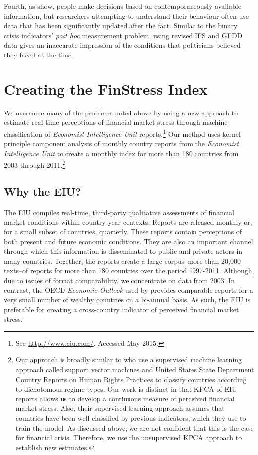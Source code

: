 \documentclass[]{article}
\begin{document}
Fourth, as \cite{KayserLeininger2015} show, people make decisions based on contemporaneously available information, but researchers attempting to understand their behaviour often use data that has been significantly updated after the fact. Similar to the binary crisis indicators' \textit{post hoc} measurement problem, using revised IFS and GFDD data gives an inaccurate impression of the conditions that politicians believed they faced at the time.

\section{Creating the FinStress Index}

We overcome many of the problems noted above by using a new approach to estimate real-time perceptions of financial market stress through machine classification of \emph{Economist Intelligence Unit} reports.\footnote{See \url{http://www.eiu.com/}. Accessed May 2015.} Our method uses kernel principle component analysis \citep{Scholkopf1998,lodhi2002,Spirling2012} of monthly country reports from the \emph{Economist Intelligence Unit} to create a monthly index for more than 180 countries from 2003 through 2011.\footnote{Our approach is broadly similar to \cite{Minhas2015} who use a supervised machine learning approach called support vector machines and United States State Department Country Reports on Human Rights Practices to classify countries according to dichotomous regime types. Our work is distinct in that KPCA of EIU reports allows us to develop a continuous measure of perceived financial market stress. Also, their supervised learning approach assumes that countries have been well classified by previous indicators, which they use to train the model. As discussed above, we are not confident that this is the case for financial crisis. Therefore, we use the unsupervised KPCA approach to establish new estimates.}

\subsection{Why the EIU?}\label{why-the-eiu}

The EIU compiles real-time, third-party qualitative assessments of financial market conditions within country-year contexts. Reports are released monthly or, for a small subset of countries, quarterly. These reports contain perceptions of both present and future economic conditions. They are also an important channel through which this information is disseminated to public and private actors in many countries. Together, the reports create a large corpus--more than 20,000 texts--of reports for more than 180 countries over the period 1997-2011. Although, due to issues of format comparability, we concentrate on data from 2003. In contrast, the OECD \emph{Economic Outlook} used by \cite{Romer2015} provides comparable reports for a very small number of wealthy countries on a bi-annual basis. As such, the EIU is preferable for creating a cross-country indicator of perceived financial market stress.
\end{document}
